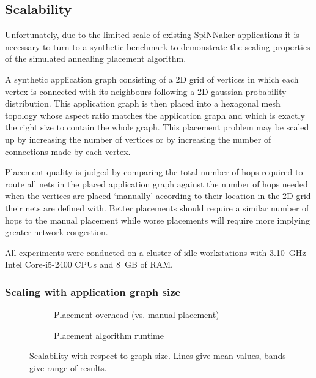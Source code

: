		\subsection{Scalability}
			
			Unfortunately, due to the limited scale of existing SpiNNaker
			applications it is necessary to turn to a synthetic benchmark to
			demonstrate the scaling properties of the simulated annealing placement
			algorithm.
			
			A synthetic application graph consisting of a 2D grid of vertices in
			which each vertex is connected with its neighbours following a 2D
			gaussian probability distribution. This application graph is then placed
			into a hexagonal mesh topology whose aspect ratio matches the application
			graph and which is exactly the right size to contain the whole graph.
			This placement problem may be scaled up by increasing the number of
			vertices or by increasing the number of connections made by each vertex.
			
			Placement quality is judged by comparing the total number of hops
			required to route all nets in the placed application graph against the
			number of hops needed when the vertices are placed `manually' according
			to their location in the 2D grid their nets are defined with. Better
			placements should require a similar number of hops to the manual
			placement while worse placements will require more implying greater
			network congestion.
			
			All experiments were conducted on a cluster of idle workstations with
			3.10~GHz Intel Core-i5-2400 CPUs and 8~GB of RAM.
			
			\subsubsection{Scaling with application graph size}
				
				\begin{figure}
					\center
					\begin{subfigure}{\linewidth}
						\center
						
						\caption{Placement overhead (vs. manual placement)}
						\label{fig:placement-scalability-size-quality}
					\end{subfigure}
					
					\begin{subfigure}{\linewidth}
						\center
						
						\caption{Placement algorithm runtime}
						\label{fig:placement-scalability-size-runtime}
					\end{subfigure}
					
					\caption{Scalability with respect to graph size. Lines give mean
					values, bands give range of results.}
					\label{fig:placement-scalability-size}
				\end{figure}
				
